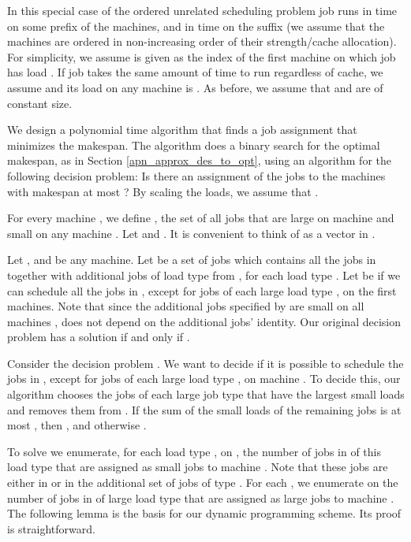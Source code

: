 \documentclass[11pt]{article}
\begin{document}
In this special case of the ordered unrelated scheduling problem job  runs in time  on some prefix of the machines, and in time  on the suffix (we assume that the machines are ordered in non-increasing order of their strength/cache allocation).  For simplicity, we assume  is given as the index of the first machine on which job  has load . If job  takes the same amount of time to run regardless of cache, we assume  and its load on any machine is . As before, we assume that  and  are of constant size.

We design a polynomial time algorithm that finds a job assignment that minimizes the makespan.
The algorithm does a binary search for the optimal makespan, as in Section \ref {apn_approx_des_to_opt}, using an algorithm for the following decision problem: Is there an assignment of the jobs  to the  machines with makespan at most ?
By scaling the loads, we assume that .

For every machine , we define , the set of all jobs that are large on machine  and small on any machine .
Let  and . It is convenient to think of  as a vector in .

Let ,  and  be any machine.
Let  be a set of jobs which contains all the jobs in  together with additional  jobs of load type  from , for each load type .
Let  be  if we can schedule all the jobs in , except for  jobs of each large load type , on the first  machines. Note that since the additional jobs specified by  are small on all machines ,  does not depend on the additional jobs' identity.
Our original decision problem has a solution if and only if .

Consider the decision problem  .
We want to decide if it is possible to schedule the jobs in , except for  jobs of each large load type , on machine . To decide this, our algorithm chooses the   jobs of each large job type  that have the largest small loads and removes them from .
If the sum of the small loads of the remaining jobs is at most ,  then , and otherwise .

To solve  we enumerate, for each load type , on , the number of jobs in  of this load type that are assigned as small jobs to machine .
Note that these jobs are either in  or in the additional set of  jobs of type .
For each , we enumerate on the number  of jobs in  of large load type  that are assigned as large jobs to machine .
The following lemma is the basis for our dynamic programming scheme. Its proof is straightforward.
\end{document}
